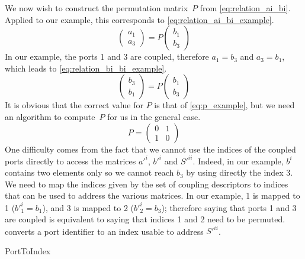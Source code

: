 We now wish to construct the permutation matrix~$P$ from \cref{eq:relation_ai_bi}.
Applied to our example, this corresponds to \cref{eq:relation_ai_bi_example}.
\begin{equation}
    \begin{pmatrix}
        a_1 \\ a_3
    \end{pmatrix}
    =
    P
    \begin{pmatrix}
        b_1 \\ b_3
    \end{pmatrix}
    \label{eq:relation_ai_bi_example}
\end{equation}
In our example, the ports 1 and 3 are coupled, therefore $a_1 = b_3$ and $a_3 = b_1$, which leads to \cref{eq:relation_bi_bi_example}.
\begin{equation}
    \begin{pmatrix}
        b_3 \\ b_1
    \end{pmatrix}
    =
    P
    \begin{pmatrix}
        b_1 \\ b_3
    \end{pmatrix}
    \label{eq:relation_bi_bi_example}
\end{equation}
It is obvious that the correct value for $P$ is that of \cref{eq:p_example}, but we need an algorithm to compute~$P$ for us in the general case.
\begin{equation}
    P =
    \begin{pmatrix}
        0 & 1 \\
        1 & 0
    \end{pmatrix}
    \label{eq:p_example}
\end{equation}
One difficulty comes from the fact that we cannot use the indices of the coupled ports directly to access the matrices $a'^i$, $b'^i$ and $S'^{ii}$.
Indeed, in our example, $b^i$ contains two elements only so we cannot reach $b_3$ by using directly the index 3.
We need to map the indices given by the set of coupling descriptors to indices that can be used to address the various matrices.
In our example, 1 is mapped to 1 ($b'^i_1 = b_1$), and 3 is mapped to 2 ($b'^i_2 = b_3$); therefore saying that ports 1 and 3 are coupled is equivalent to saying that indices 1 and 2 need to be permuted.
 converts a port identifier to an index usable to address $S'^{ii}$.
\begin{algorithm}
    \caption{PortToIndex}
    \label{algo:port_to_index}
    \begin{algorithmic}
         
         
        \\ 
        \EndFunction
    \end{algorithmic}
\end{algorithm}

